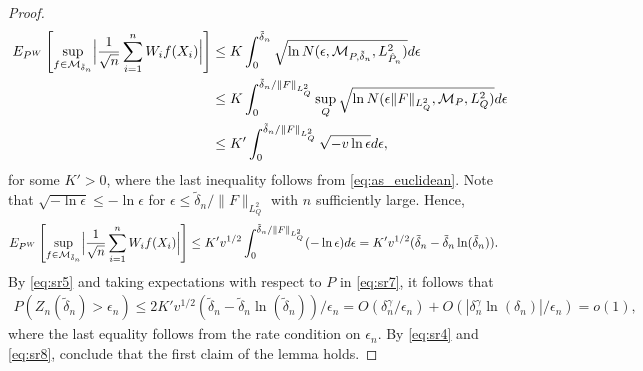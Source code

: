 \documentclass[letterpaper,11pt]{article}
\theoremstyle{myplain}
\theoremstyle{mydefinition}
\theoremstyle{myremark}
\numberwithin{equation}{section}
\numberwithin{figure}{section}
\begin{document}
\begin{appendices}
\begin{proof}
\begin{align}
	E_{P^W}\left[\sup_{f\in\mathcal M_{\tilde\delta_n}}\Bigl\vert\frac{1}{\sqrt n}\sum_{i=1}^nW_i f(X_i)\Bigr\vert \right]&\le K\int_0^{\tilde\delta_n}\sqrt{\ln N(\epsilon,\mathcal M_{P,\tilde\delta_n},L^2_{\hat P_n})}d\epsilon\notag\\
	&\le K\int_0^{\tilde\delta_n/\|F\|_{L^2_Q}}\sup_Q\sqrt{\ln N(\epsilon \|F\|_{L^2_Q},\mathcal M_P,L^2_Q)}d\epsilon\notag\\
	&\le K'\int_0^{\tilde\delta_n/\|F\|_{L^2_Q}}\sqrt{-v\ln\epsilon}d\epsilon,\label{eq:sr6}
\end{align}
for some $K'>0$, 
where the last inequality follows from \eqref{eq:as_euclidean}.
Note that $\sqrt{-\ln \epsilon}\le -\ln \epsilon$ for $\epsilon\le \tilde\delta_n/\|F\|_{L^2_Q}$ with $n$ sufficiently large. Hence, 
\begin{align}
E_{P^W}\left[\sup_{f\in\mathcal M_{\tilde\delta_n}}\Bigl\vert\frac{1}{\sqrt n}\sum_{i=1}^nW_i f(X_i)\Bigr\vert\right]&\le K'v^{1/2}\int_0^{\tilde\delta_n/\|F\|_{L^2_Q}} (-\ln\epsilon) d\epsilon 	=K'v^{1/2}(\tilde\delta_n-\tilde\delta_n\ln(\tilde\delta_n)).\label{eq:sr7}
\end{align}
By \eqref{eq:sr5} and taking expectations with respect to $P$ in \eqref{eq:sr7}, it follows that
\begin{align}
P(Z_n(\tilde\delta_n)>\epsilon_n)\le 2K'v^{1/2}(\tilde\delta_n-\tilde\delta_n\ln(\tilde\delta_n))/\epsilon_n=O(\delta_n^\gamma/\epsilon_n)+O(|\delta_n^\gamma\ln(\delta_n)|/\epsilon_n)=o(1),	\label{eq:sr8}
\end{align}
where the last equality follows from the rate condition on $\epsilon_n$. By \eqref{eq:sr4} and \eqref{eq:sr8}, conclude that the first claim of the lemma holds.


\end{proof}
\end{appendices}
\end{document}
